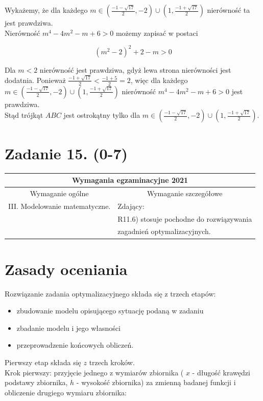 \documentclass[10pt]{article}
\begin{document}
Wykażemy, że dla każdego $m \in\left(\frac{-1-\sqrt{17}}{2},-2\right) \cup\left(1, \frac{-1+\sqrt{17}}{2}\right)$ nierówność ta jest prawdziwa.\\
Nierówność $m^{4}-4 m^{2}-m+6>0$ możemy zapisać w postaci

$$
\left(m^{2}-2\right)^{2}+2-m>0
$$

Dla $m<2$ nierówność jest prawdziwa, gdyż lewa strona nierówności jest dodatnia. Ponieważ $\frac{-1+\sqrt{17}}{2}<\frac{-1+5}{2}=2$, więc dla każdego $m \in\left(\frac{-1-\sqrt{17}}{2},-2\right) \cup\left(1, \frac{-1+\sqrt{17}}{2}\right)$ nierówność $m^{4}-4 m^{2}-m+6>0$ jest prawdziwa.\\
Stąd trójkąt $A B C$ jest ostrokątny tylko dla $m \in\left(\frac{-1-\sqrt{17}}{2},-2\right) \cup\left(1, \frac{-1+\sqrt{17}}{2}\right)$.

\section*{Zadanie 15. (0-7)}
\begin{center}
\begin{tabular}{|l|l|}
\hline
\multicolumn{2}{|c|}{Wymagania egzaminacyjne 2021} \\
\hline
\multicolumn{1}{|c|}{Wymaganie ogólne} & \multicolumn{1}{c|}{Wymaganie szczegółowe} \\
\hline
III. Modelowanie matematyczne. & Zdający: \\
 & R11.6) stosuje pochodne do rozwiązywania \\
 & zagadnień optymalizacyjnych. \\
\hline
\end{tabular}
\end{center}

\section*{Zasady oceniania}
Rozwiązanie zadania optymalizacyjnego składa się z trzech etapów:

\begin{itemize}
  \item zbudowanie modelu opisującego sytuację podaną w zadaniu
  \item zbadanie modelu i jego własności
  \item przeprowadzenie końcowych obliczeń.
\end{itemize}

Pierwszy etap składa się $z$ trzech kroków.\\
Krok pierwszy: przyjęcie jednego z wymiarów zbiornika ( $x$ - długość krawędzi podstawy zbiornika, $h$ - wysokość zbiornika) za zmienną badanej funkcji i obliczenie drugiego wymiaru zbiornika:
\end{document}

